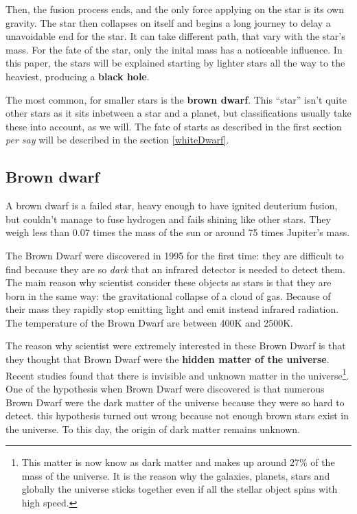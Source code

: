 \documentclass[a4paper, 11pt]{article} %
\begin{document}
Then, the fusion process ends, and the only force applying on the star is its own gravity. The star then collapses on itself and begins a long journey to delay a unavoidable end for the star. It can take different path, that vary with the star's mass. For the fate of the star, only the inital mass has a noticeable influence. In this paper, the stars will be explained starting by lighter stars all the way to the heaviest, producing a \textbf{black hole}.

The most common, for smaller stars is the \textbf{brown dwarf}. This ``star'' isn't quite other stars as it sits inbetween a star and a planet, but classifications usually take these into account, as we will. The fate of starts as described in the first section \textit{per say} will be described in the section \ref{whiteDwarf}.

\subsection{Brown dwarf}

A brown dwarf is a failed star, heavy enough to have ignited deuterium fusion, but couldn't manage to fuse hydrogen and fails shining like other stars. They weigh less than 0.07 times the mass of the sun or around 75 times Jupiter's mass.


The Brown Dwarf were discovered in 1995 for the first time: they are difficult to find because they are so \textit{dark} that an infrared detector is needed to detect them. 
The main reason why scientist consider these objects as stars is that they are born in the same way: the gravitational collapse of a cloud of gas. Because of their mass they rapidly stop emitting light and emit instead infrared radiation. The temperature of the Brown Dwarf are between 400K and 2500K. 


The reason why scientist were extremely interested in these Brown Dwarf is that they thought that Brown Dwarf were the \textbf{hidden matter of the universe}. Recent studies found that there is invisible and unknown matter in the universe\footnote{ This matter is now know as dark matter and makes up around 27\% of the mass of the universe. It is the reason why the galaxies, planets, stars and globally the universe sticks together even if all the stellar object spins with high speed.}. One of the hypothesis when Brown Dwarf were discovered is that numerous Brown Dwarf were the dark matter of the universe because they were so hard to detect. this hypothesis turned out wrong because not enough brown stars exist in the universe. To this day, the origin of dark matter remains unknown.
\end{document}
